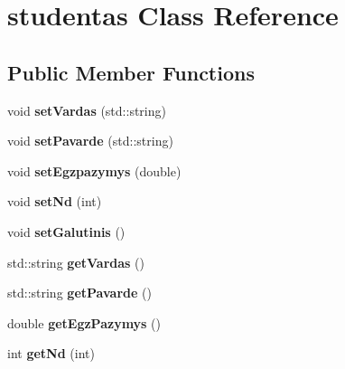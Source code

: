 \hypertarget{classstudentas}{}\section{studentas Class Reference}
\label{classstudentas}
\subsection*{Public Member Functions}
\begin{DoxyCompactItemize}
\item 
\mbox{\label{classstudentas_a53e08c840094a97e4cc55885945972c3}} 
void {\bfseries set\+Vardas} (std\+::string)
\item 
\mbox{\label{classstudentas_ae5d2c5220a62efa1c93dad30ea22b357}} 
void {\bfseries set\+Pavarde} (std\+::string)
\item 
\mbox{\label{classstudentas_a12df2a06aa861318a6c1d68b26bbbd1a}} 
void {\bfseries set\+Egzpazymys} (double)
\item 
\mbox{\label{classstudentas_a06ab8f6d0ec9d2057791b5f2c66cfb2a}} 
void {\bfseries set\+Nd} (int)
\item 
\mbox{\label{classstudentas_a54ff67fcba8017e30a7c674b444ebd58}} 
void {\bfseries set\+Galutinis} ()
\item 
\mbox{\label{classstudentas_acace0516680f0260cb123c4f5ee1cf28}} 
std\+::string {\bfseries get\+Vardas} ()
\item 
\mbox{\label{classstudentas_a2b701dc048d6ddde7fc465d97421d2da}} 
std\+::string {\bfseries get\+Pavarde} ()
\item 
\mbox{\label{classstudentas_af9d42ea1a779ff12cb2129db51b84bc2}} 
double {\bfseries get\+Egz\+Pazymys} ()
\item 
\mbox{\label{classstudentas_a3d157ef8612818cc32cf6e1e3ed0500e}} 
int {\bfseries get\+Nd} (int)
\item 
\mbox{\label{classstudentas_a15556a37b90fcbe4a69bdddff9c4c456}} 

\end{DoxyCompactItemize}
